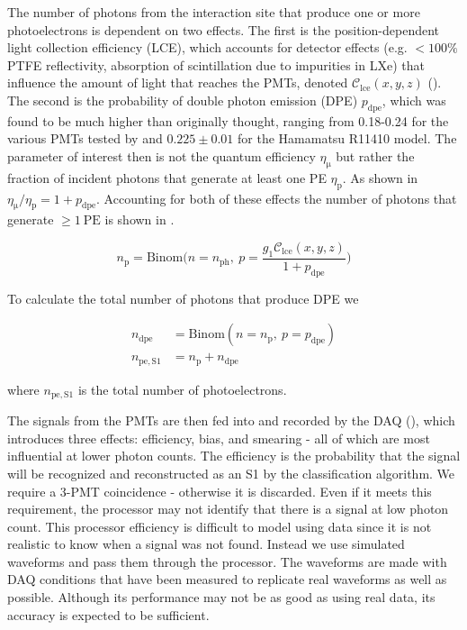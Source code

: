 The number of photons from the interaction site that produce one or more photoelectrons is dependent on two effects.  The first is
the position-dependent light collection efficiency (LCE), which accounts for detector effects (e.g. $<100\%$ PTFE reflectivity,
absorption of
scintillation due to impurities in LXe) that influence the amount of light that reaches the PMTs, denoted $\mathcal{C}_{\mathrm{lce}}(x, y, z)$
().  The second is the probability of double photon emission (DPE) $p_{\mathrm{dpe}}$, which was found
to be much higher than originally thought, ranging from 0.18-0.24 for the various PMTs tested by  and $0.225 \pm 0.01$
for the Hamamatsu R11410 model.  The parameter of interest then is not the quantum efficiency $\eta_{\mathrm{\mu}}$ but rather the
fraction of incident photons that generate at least one PE $\eta_{\mathrm{p}}$.  As shown in 
$\eta_{\mathrm{\mu}} / \eta_{\mathrm{p}} = 1 + p_{\mathrm{dpe}}$.  Accounting for both of these effects the number of photons that
generate $\geq 1\ \mathrm{PE}$ is shown in .

\begin{equation}
n_{\mathrm{p}} = \mathrm{Binom} \bigg( n = n_{\mathrm{ph}},\ p = \frac{g_1 \mathcal{C}_{\mathrm{lce}}(x, y, z)}{1 + p_{\mathrm{dpe}}} \bigg)
\label{eq:er_nr_calibrations_parameter_determ_det_phys_npe}
\end{equation}

To calculate the total number of photons that produce DPE we

\begin{equation}
\begin{aligned}
n_{\mathrm{dpe}} &= \mathrm{Binom} (n = n_{\mathrm{p}},\ p = p_{\mathrm{dpe}} ) \\
n_{\mathrm{pe,S1}} &= n_{\mathrm{p}} + n_{\mathrm{dpe}}
\end{aligned}
\end{equation}

\noindent where $n_{\mathrm{pe,S1}}$ is the total number of photoelectrons.

The signals from the PMTs are then fed into and recorded by the DAQ (), which introduces three effects:
efficiency, bias, and smearing - all of which are most influential at lower photon counts.  The efficiency is the probability that the
signal will be recognized and reconstructed as an S1 by the
classification algorithm.  We require a 3-PMT coincidence - otherwise it is discarded.  Even if it meets this requirement, the processor
may not identify that there is a signal at low photon count.  This processor efficiency is difficult to model using data since it is
not realistic to know when a signal was not found.  Instead we use simulated waveforms and pass them through the processor.  The
waveforms are made with DAQ conditions that have been measured to replicate real waveforms as well as possible.  Although its performance
may not be as good as using real data, its accuracy is expected to be sufficient.

